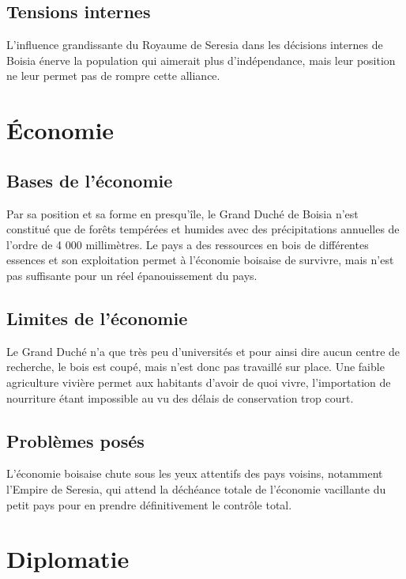 \documentclass[french, a4paper, 12pt]{article}
\begin{document}
\subsection{Tensions internes}

L'influence grandissante du Royaume de Seresia dans les décisions internes de Boisia énerve la population qui aimerait plus d'indépendance, mais leur position ne leur permet pas de rompre cette alliance.

\section{Économie}

\subsection{Bases de l'économie}

Par sa position et sa forme en presqu'île, le Grand Duché de Boisia n'est constitué que de forêts tempérées et humides avec des précipitations annuelles de l'ordre de 4 000 millimètres. Le pays a des ressources en bois de différentes essences et son exploitation permet à l'économie boisaise de survivre, mais n'est pas suffisante pour un réel épanouissement du pays.

\subsection{Limites de l'économie}

Le Grand Duché n'a que très peu d'universités et pour ainsi dire aucun centre de recherche, le bois est coupé, mais n'est donc pas travaillé sur place. Une faible agriculture vivière permet aux habitants d'avoir de quoi vivre, l'importation de nourriture étant impossible au vu des délais de conservation trop court.

\subsection{Problèmes posés}

L'économie boisaise chute sous les yeux attentifs des pays voisins, notamment l'Empire de Seresia, qui attend la déchéance totale de l'économie vacillante du petit pays pour en prendre définitivement le contrôle total.

\section{Diplomatie}
\end{document}
